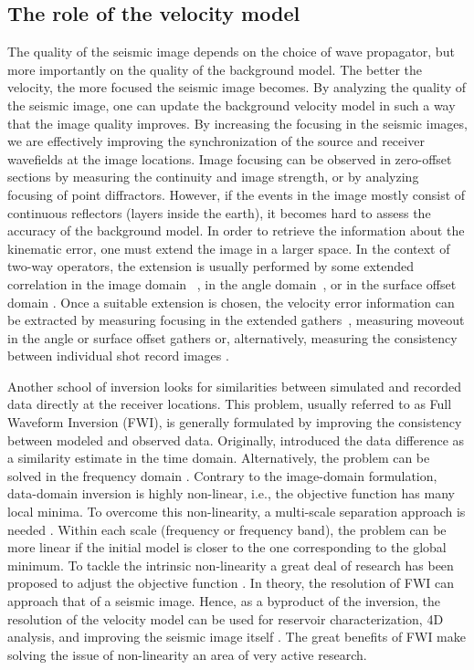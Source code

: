 \subsection{The role of the velocity model}
The quality of the seismic image depends on the choice of wave propagator, but more importantly
 on the quality of the background model. The better the velocity, the more
 focused the seismic image becomes. By analyzing the quality of the 
seismic image,  one can update the background velocity model in such a way that the image quality improves. 
 By increasing the focusing in the seismic images, we are effectively improving the synchronization
of the source and receiver wavefields at the image locations. 
 Image focusing can be observed in zero-offset sections by measuring the 
continuity and image strength, or by analyzing focusing of point diffractors. 
 However, if the events in the image mostly consist of continuous reflectors (layers inside the earth),
it becomes hard to assess the accuracy of the background model. 
 In order to retrieve the information about the kinematic error, one must extend the 
image in a larger space. In the context of two-way operators, 
the extension is usually performed by some extended correlation in the image domain
~\citep{rickett:883,sava:S209,GPR:GPR888}, in the angle domain~\citep{sava:1065,yoon,Jin,yoon2,Vyas}, or 
 in the surface offset domain \citep{giboli}. 
 Once a suitable extension is chosen, the velocity error information can be extracted by measuring 
focusing in the extended gathers~\citep{ShenSymes.geo.2008,Wiktor,tony_seg:cwp12,Shan:chevron,BiondiAli:2014,diaz2015,tony:gp15},
 measuring moveout in the angle or surface offset gathers \citep{Liu2010,yiShen,Fleury} or, alternatively,
 measuring the consistency between individual shot record images \citep{perrone2015waveform}.

Another school of inversion looks for similarities between simulated and recorded data
directly at the receiver locations. This problem, usually referred to as Full Waveform Inversion (FWI),
is generally formulated by  improving the consistency between modeled and observed data. 
 Originally, \cite{tarantola} introduced the data difference as 
a similarity estimate in the time domain. Alternatively, the problem 
can be solved in the frequency domain \citep{Pratt99}. Contrary to 
 the image-domain formulation, data-domain inversion is highly non-linear, 
i.e., the objective function has many local minima. To overcome this non-linearity,
 a multi-scale separation approach is needed \citep{Bunks95}. Within each scale (frequency
or frequency band), the problem can be more linear if the initial model
is closer to the one corresponding to the global minimum. To tackle the intrinsic
non-linearity a great deal of research has been proposed to adjust the objective 
function \citep{ShinHa.geo.2008,shin_cha,Sirgue,engquist2013application,Luo91,warner,TariqChoi}. In theory, the resolution
of FWI can approach that of a seismic image. Hence, as a byproduct of the 
inversion, the resolution of the velocity model can be used for reservoir characterization, 4D analysis,
and improving the seismic image itself \cite{sirgue20093d}. The great benefits
of FWI make solving the issue of non-linearity an area of very active research. 


